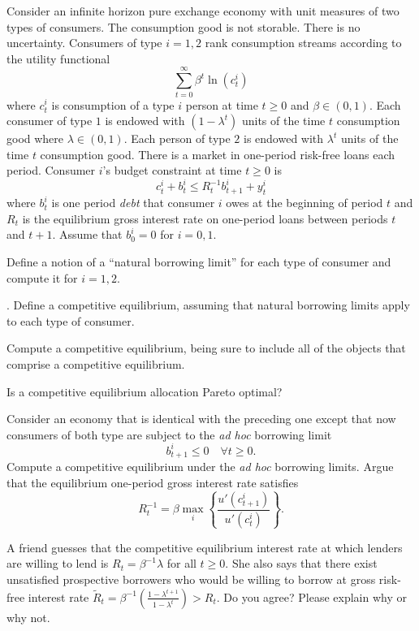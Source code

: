Consider an infinite horizon pure exchange economy with unit measures of two types of consumers. The consumption good is not storable.  There is no uncertainty.
Consumers of type  $i=1,2$ rank consumption streams according to the utility functional
$$ \sum_{t=0}^\infty \beta^t \ln (c^i_t) $$
where $c_t^i$ is consumption of a type $i$ person at time $t \geq 0$ and $\beta \in (0,1)$. 
Each consumer of type $1$ is endowed with $(1-\lambda^t)$ units of the time $t$ consumption good where
$\lambda \in (0,1)$. Each person of type $2$ is endowed with $\lambda^t$ units of the time $t$ consumption good. 
There is a market in one-period risk-free loans each period.  Consumer $i$'s budget constraint at time $t \geq 0$ is
$$ c_t^i + b_t^i \leq R_t^{-1} b^i_{t+1} + y_t^i $$
where $b_t^i$ is one period {\it debt} that consumer $i$ owes at the beginning of period $t$ and $R_t$ is the 
equilibrium gross interest rate on one-period loans between periods $t$ and $t+1$.  Assume that $b_0^i=0$ for
$i=0,1$.

\medskip

 Define a notion of a ``natural borrowing limit'' for each type of consumer and compute it
for $i =1,2$.

\medskip
{}. Define a competitive equilibrium, assuming that natural borrowing limits apply to each type of consumer.  

\medskip
{} Compute a competitive equilibrium, being sure to include all of the objects that comprise a competitive
equilibrium.

\medskip
{} Is a competitive equilibrium allocation Pareto optimal?

\medskip
{} Consider an economy that is identical with the preceding one except that now 
consumers of both type are subject to the {\it ad hoc\/} borrowing limit
$$ b^i_{t+1} \leq 0 \quad \forall t \geq 0 .$$   Compute a competitive equilibrium under the {\it ad hoc\/} borrowing
limits.  Argue that the equilibrium one-period gross interest rate satisfies
$$ R_t^{-1} = \beta \max_i \left\{ {\frac{u'(c^i_{t+1})}{u'(c^i_t)}}   \right\} .$$

\medskip
{} A friend guesses that the competitive equilibrium interest rate at which lenders are willing 
to lend is $R_t = \beta^{-1} \lambda $ for all $t \geq 0$.  She also says that there exist unsatisfied prospective borrowers
who would be willing to borrow at gross risk-free interest rate $\tilde R_t = \beta^{-1} \left({\frac{1 - \lambda^{t+1}}
{1 - \lambda^t}}\right) > R_t$.  Do you agree? Please explain why or why not.

